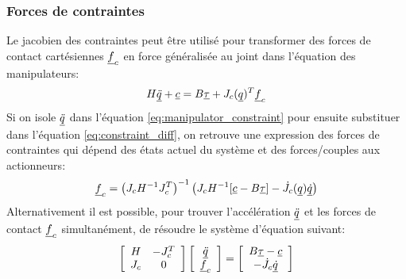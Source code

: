 \subsubsection{Forces de contraintes}
\label{sec:constraint_forces}

Le jacobien des contraintes peut être utilisé pour transformer des forces de contact cartésiennes $\underline{f}_c$ en force généralisée au joint dans l'équation des manipulateurs:
%
\begin{align}
H \underline{\ddot{q}} + \underline{c} = B \underline{\tau} + J_c( \underline{ q } )^T  \underline{f}_c
\label{eq:manipulator_constraint}
\end{align}
%
Si on isole $\underline{\ddot{q}}$ dans l'équation \eqref{eq:manipulator_constraint} pour ensuite substituer dans l'équation \eqref{eq:constraint_diff}, on retrouve une expression des forces de contraintes qui dépend des états actuel du système et des forces/couples aux actionneurs:
%
\begin{align}
\underline{f}_c = \left( J_c H^{-1} J_c^T \right)^{-1} \left(  J_c H^{-1} [\underline{c} - B \underline{\tau} ] - \dot{J}_c( \underline{ q } ) \underline{\dot{q}}   \right)
\label{eq:const_forces}
\end{align}
%
Alternativement il est possible, pour trouver l'accélération $\underline{\ddot{q}}$ et les forces de contact $\underline{f}_c$ simultanément, de résoudre le système d'équation suivant:
%
\begin{align}
\left[ \begin{array}{c c } 	H & -J_c^T  \\ J_c 	& 0  	\end{array} \right] \left[ \begin{array}{c} \underline{\ddot{q}}  \\ \underline{f}_c \end{array} \right] = \left[ \begin{array}{c}  B \underline{\tau} - \underline{c}   \\ -\dot{J}_c \underline{\dot{q}}  \end{array} \right]
\label{eq:manipulator_constraint_eom}
\end{align}


